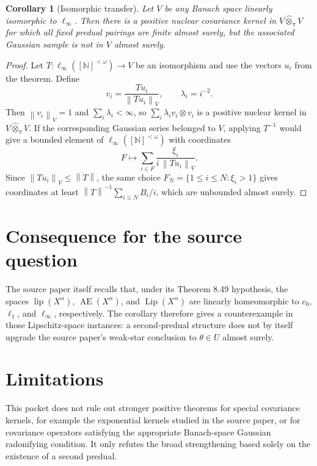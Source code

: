 \documentclass[11pt]{article}
\newtheorem{corollary}{Corollary}
\newcommand{\N}{\mathbb N}
\newcommand{\Gammafin}{[\N]^{<\omega}}
\newcommand{\norm}[1]{\left\lVert #1\right\rVert}
\begin{document}
\begin{corollary}[Isomorphic transfer]
Let \(V\) be any Banach space linearly isomorphic to \(\ell_\infty\).  Then
there is a positive nuclear covariance kernel in
\(V\widehat{\otimes}_\pi V\) for which all fixed predual pairings are finite
almost surely, but the associated Gaussian sample is not in \(V\) almost
surely.
\end{corollary}

\begin{proof}
Let \(T:\ell_\infty(\Gammafin)\to V\) be an isomorphism and use the vectors
\(u_i\) from the theorem.  Define
\[
  v_i=\frac{Tu_i}{\norm{Tu_i}_V},\qquad \lambda_i=i^{-2}.
\]
Then \(\norm{v_i}_V=1\) and \(\sum_i\lambda_i<\infty\), so
\(\sum_i \lambda_i v_i\otimes v_i\) is a positive nuclear kernel in
\(V\widehat{\otimes}_\pi V\).  If the corresponding Gaussian series belonged
to \(V\), applying \(T^{-1}\) would give a bounded element of
\(\ell_\infty(\Gammafin)\) with coordinates
\[
  F\mapsto \sum_{i\in F}\frac{\xi_i}{i\,\norm{Tu_i}_V}.
\]
Since \(\norm{Tu_i}_V\le \norm{T}\), the same choice
\(F_N=\{1\le i\le N:\xi_i>1\}\) gives coordinates at least
\(\norm{T}^{-1}\sum_{i\le N}B_i/i\), which are unbounded almost surely.
\end{proof}

\section*{Consequence for the source question}

The source paper itself recalls that, under its Theorem 8.49 hypothesis, the
spaces \(\operatorname{lip}(X^\alpha)\), \(\operatorname{AE}(X^\alpha)\), and
\(\operatorname{Lip}(X^\alpha)\) are linearly homeomorphic to \(c_0\),
\(\ell_1\), and \(\ell_\infty\), respectively.  The corollary therefore gives
a counterexample in those Lipschitz-space instances: a second-predual
structure does not by itself upgrade the source paper's weak-star conclusion
to \(\theta\in U\) almost surely.

\section*{Limitations}

This packet does not rule out stronger positive theorems for special covariance
kernels, for example the exponential kernels studied in the source paper, or
for covariance operators satisfying the appropriate Banach-space Gaussian
radonifying condition.  It only refutes the broad strengthening based solely on
the existence of a second predual.
\end{document}
